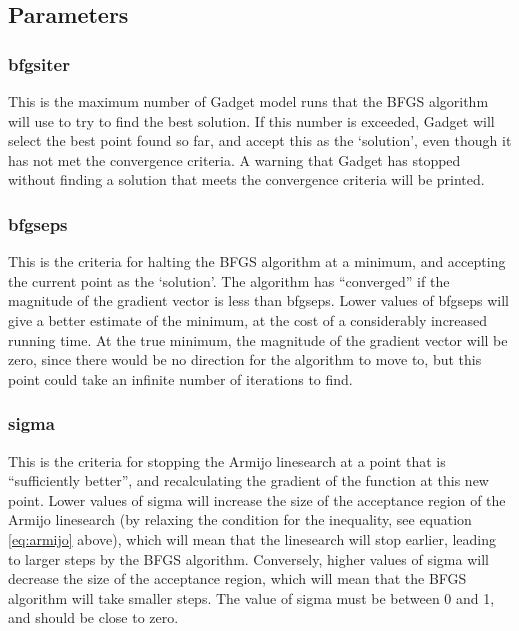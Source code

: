 \documentclass[]{book}
\begin{document}
\hypertarget{subsec:bfgspar}{%
\subsection{Parameters}\label{subsec:bfgspar}}

\hypertarget{bfgsiter}{%
\subsubsection{bfgsiter}\label{bfgsiter}}

This is the maximum number of Gadget model runs that the BFGS algorithm
will use to try to find the best solution. If this number is exceeded,
Gadget will select the best point found so far, and accept this as the
`solution', even though it has not met the convergence criteria. A
warning that Gadget has stopped without finding a solution that meets
the convergence criteria will be printed.

\hypertarget{bfgseps}{%
\subsubsection{bfgseps}\label{bfgseps}}

This is the criteria for halting the BFGS algorithm at a minimum, and
accepting the current point as the `solution'. The algorithm has
``converged'' if the magnitude of the gradient vector is less than
bfgseps. Lower values of bfgseps will give a better estimate of the
minimum, at the cost of a considerably increased running time. At the
true minimum, the magnitude of the gradient vector will be zero, since
there would be no direction for the algorithm to move to, but this point
could take an infinite number of iterations to find.

\hypertarget{sigma}{%
\subsubsection{sigma}\label{sigma}}

This is the criteria for stopping the Armijo linesearch at a point that
is ``sufficiently better'', and recalculating the gradient of the function
at this new point. Lower values of sigma will increase the size of the
acceptance region of the Armijo linesearch (by relaxing the condition
for the inequality, see
equation \eqref{eq:armijo} above), which will mean that the linesearch will
stop earlier, leading to larger steps by the BFGS algorithm. Conversely,
higher values of sigma will decrease the size of the acceptance region,
which will mean that the BFGS algorithm will take smaller steps. The
value of sigma must be between 0 and 1, and should be close to zero.
\end{document}
